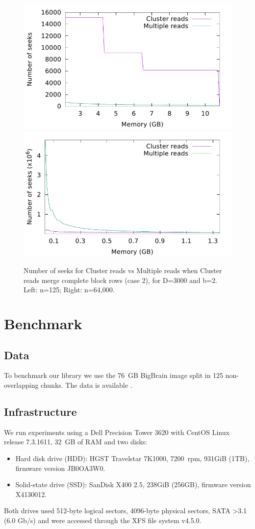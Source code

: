\documentclass[10pt, conference, compsocconf]{IEEEtran}
\newcommand{\todo}[1]{\marginpar{\parbox{18mm}{\flushleft\tiny\color{red}\textbf{TODO}:
      #1}}}
\begin{document}
\begin{figure}
  \includegraphics[width=0.45\columnwidth]{figures/model-big-brain.pdf}
  \includegraphics[width=0.45\columnwidth]{figures/model-big-brain-rescan.pdf}
  \caption{Number of seeks for Cluster reads vs Multiple reads when
    Cluster reads merge complete block rows (case 2), for D=3000 and
    b=2. Left: n=125; Right: n=64,000.}
  \label{fig:model-comparison}
\end{figure}

\section{Benchmark}
\label{sec:benchmark}

\subsection{Data}
To benchmark our library we use the 76~GB BigBrain image split in 125
non-overlapping chunks. The data is available \todo{[here]}.

\subsection{Infrastructure}

We run experiments using a Dell Precision Tower 3620 with CentOS Linux release
7.3.1611, 32~GB of RAM and two disks:
\begin{itemize}
  \item Hard disk drive (HDD): HGST Travelstar 7K1000, 7200~rpm, 931GiB (1TB), firmware version JB0OA3W0.
    \item Solid-state drive (SSD): SanDisk X400 2.5, 238GiB (256GB),
      firmware version X4130012.
\end{itemize}
Both drives used 512-byte logical sectors, 4096-byte physical sectors,
SATA >3.1 (6.0 Gb/s) and were accessed through the XFS file system
v4.5.0.
\end{document}
